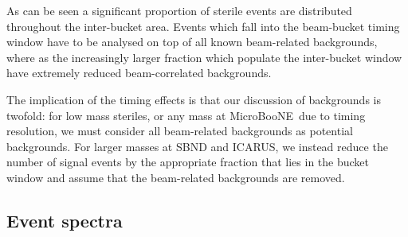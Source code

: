 \documentclass[11pt, a4paper]{article}
\def\muboone{MicroBooNE}
\begin{document}
As can be seen a significant proportion of sterile events are distributed throughout the inter-bucket area. Events which fall into the beam-bucket timing window have to be analysed on top of all known beam-related backgrounds, where as the increasingly larger fraction which populate the inter-bucket window have extremely reduced beam-correlated backgrounds.  

The implication of the timing effects is that our discussion of backgrounds is
twofold: for low mass steriles, or any mass at \muboone\ due to timing
resolution, we must consider all beam-related backgrounds as potential
backgrounds. For larger masses at SBND and ICARUS, we instead reduce the number of signal events by the appropriate fraction that lies in the bucket window and assume that the beam-related backgrounds are removed. 


\subsection{\label{sec:eventspectra}Event spectra}
\end{document}

